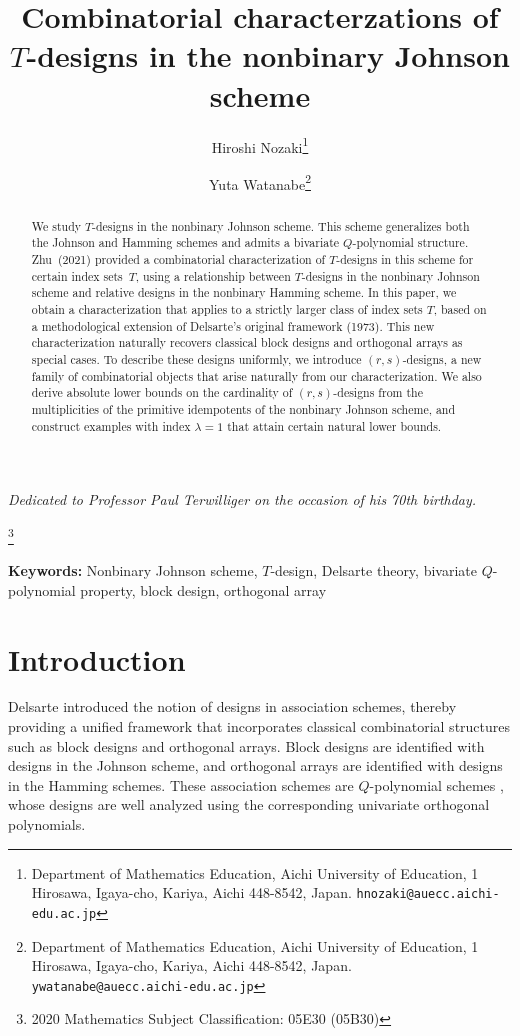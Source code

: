 \documentclass[a4paper, 11pt]{article}
\title{Combinatorial characterzations of $T$-designs in the nonbinary Johnson scheme}
\author{Hiroshi Nozaki\thanks{Department of Mathematics Education, 
	Aichi University of Education, 
	1 Hirosawa, Igaya-cho, 
	Kariya, Aichi 448-8542, 
	Japan. {\tt hnozaki@auecc.aichi-edu.ac.jp}} 
    \and Yuta Watanabe\thanks{Department of Mathematics Education, 
	Aichi University of Education, 
	1 Hirosawa, Igaya-cho, 
	Kariya, Aichi 448-8542, 
	Japan. {\tt ywatanabe@auecc.aichi-edu.ac.jp}}}
\theoremstyle{definition}
\begin{document}
\maketitle

\begin{center}
\textit{Dedicated to Professor Paul Terwilliger on the occasion of his 70th birthday.}
\end{center}

\renewcommand{\thefootnote}{\fnsymbol{footnote}}
\footnote[0]{2020 Mathematics Subject Classification: 05E30 (05B30)
}

\begin{abstract}
We study $T$-designs in the nonbinary Johnson scheme. This scheme generalizes both the Johnson and 
Hamming schemes and admits a bivariate $Q$-polynomial structure. Zhu~(2021) provided a 
combinatorial characterization of $T$-designs in this scheme for certain index sets~$T$, using 
a relationship between $T$-designs in the nonbinary Johnson scheme and relative designs in 
the nonbinary Hamming scheme. In this paper, we obtain a characterization that applies to a 
strictly larger class of index sets $T$, based on a methodological extension of Delsarte’s 
original framework (1973). This new characterization naturally recovers classical block designs and orthogonal arrays as special cases. To describe these designs uniformly, we 
introduce $(r,s)$-designs, a new family of combinatorial objects that arise naturally from our 
characterization. We also derive absolute lower bounds on the cardinality of $(r,s)$-designs 
from the multiplicities of the primitive idempotents of the nonbinary Johnson scheme, and 
construct examples with index $\lambda=1$ that attain certain natural lower bounds.
\end{abstract}

\noindent
\textbf{Keywords:} Nonbinary Johnson scheme, $T$-design, Delsarte theory, bivariate $Q$-polynomial property, block design, orthogonal array
\section{Introduction}
Delsarte \cite{D73} introduced the notion of designs in association schemes, thereby providing a unified framework that incorporates classical combinatorial structures such as block designs and orthogonal arrays.
Block designs are identified with designs in the Johnson scheme, and orthogonal arrays are identified with designs in the Hamming schemes.
These association schemes are $Q$-polynomial schemes \cite{D73}, whose designs are well analyzed using the corresponding univariate orthogonal polynomials. 
\end{document}
